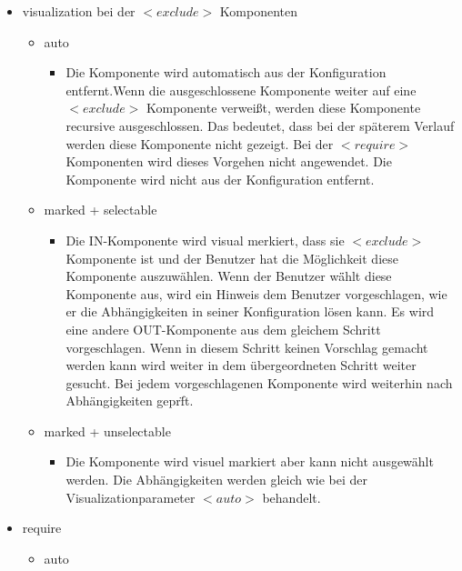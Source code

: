 \documentclass{article}
\begin{document}
\begin{itemize} 
    \item visualization bei der $<exclude>$ Komponenten
    \begin{itemize}
        \item auto 
        \begin{itemize}
            \item Die Komponente wird automatisch aus der Konfiguration
            entfernt.Wenn die ausgeschlossene Komponente weiter auf
            eine $<exclude>$ Komponente verwei\ss{}t, werden diese Komponente 
            recursive ausgeschlossen. Das 
            bedeutet, dass bei der sp\"aterem Verlauf werden diese
            Komponente nicht gezeigt. Bei der $<require>$ Komponenten
            wird dieses Vorgehen nicht angewendet. Die Komponente wird nicht aus der 
            Konfiguration entfernt.
        \end{itemize}
        \item marked + selectable
        \begin{itemize}
            \item Die IN-Komponente wird visual merkiert, dass sie
            $<exclude>$ Komponente ist und der Benutzer hat die
            M\"oglichkeit diese Komponente auszuw\"ahlen.
            Wenn der Benutzer w\"ählt diese Komponente aus, wird ein
            Hinweis dem Benutzer vorgeschlagen, wie er die Abh\"angigkeiten
            in seiner Konfiguration l\"osen kann. Es wird eine andere
            OUT-Komponente aus dem gleichem Schritt vorgeschlagen. Wenn in
            diesem Schritt keinen Vorschlag gemacht werden kann wird weiter
            in dem übergeordneten Schritt weiter gesucht. Bei jedem
            vorgeschlagenen Komponente wird weiterhin nach Abh\"angigkeiten
            gepr\"ft.
        \end{itemize}
        \item marked + unselectable
        \begin{itemize}
            \item Die Komponente wird visuel markiert aber kann nicht
            ausgew\"ahlt werden. Die Abh\"angigkeiten werden gleich wie bei der
            Visualizationparameter $<auto>$ behandelt.
        \end{itemize}
    \end{itemize}
    \item require
    \begin{itemize}
        \item auto

\end{itemize}
\end{itemize}
\end{document}

